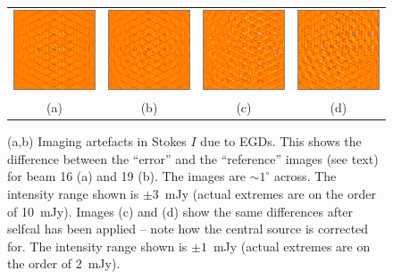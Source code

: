 \documentclass{aps2010} \special{papersize=8.5in,11in}
\begin{document}
\begin{figure}
\begin{tabular}{@{}cccc@{}}
\includegraphics[width=3.8cm]{diff15uncal} &
\includegraphics[width=3.8cm]{diff18uncal} &
\hfill\includegraphics[width=3.8cm]{diff15cal} &
\hfill\includegraphics[width=3.8cm]{diff18cal} \\
(a)&(b)&(c)&(d)
\end{tabular}
\caption{\label{fig:diff}(a,b) Imaging artefacts in Stokes $I$ due to EGDs. This shows the difference between the ``error'' and the ``reference'' images (see text) for beam 16 (a) and 19 (b). The images are $\sim1^\circ$ across. The intensity range shown is $\pm3$~mJy (actual extremes are on the order of 10~mJy). Images (c) and (d) show the same differences after selfcal has been applied -- note how the central source is corrected for. The intensity range shown is $\pm1$~mJy (actual extremes are on the order of 2~mJy).}
\end{figure}
\end{document}
